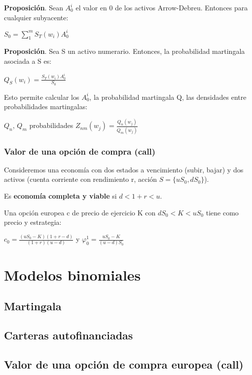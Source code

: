 \documentclass[
10pt, %
a4paper, %
oneside, %
headinclude,footinclude, %
BCOR5mm, %
]{scrartcl}
\newcommand{\n}[1]{\textbf{#1}}
\newcommand{\sub}[1]{_{#1}}
\newcommand{\pot}[1]{^{#1}}
\newcommand{\f}[1]{{\large{${#1}$}}}
\newcommand{\sumatorio}[2]{\sum_{#1}^{#2}}
\newcounter{ex}
\begin{document}
			\n{Proposición}. Sean \f{A\sub{0}\pot{i}} el valor en \f{0} de los activos Arrow-Debreu. Entonces para cualquier subyacente:
			\begin{center} \f{S\sub{0} = \sumatorio{1}{m} S\sub{T}(w\sub{i})A\sub{0}\pot{i}} \end{center}

			\n{Proposición}. Sea S un activo numerario. Entonces, la probabilidad martingala asociada a S es:
			\begin{center} \f{Q\sub{S}(w\sub{i}) = \frac{S\sub{T}(w\sub{i}) A\sub{0}\pot{i}}{S\sub{0}}} \end{center}

			Esto permite calcular los \f{A\sub{0}\pot{i}}, la probabilidad martingala Q, las densidades entre probabilidades martingalas: 
			\begin{center} \f{Q\sub{n}}, \f{Q\sub{m}} probabilidades \f{Z\sub{nm}(w\sub{j}) = \frac{Q\sub{n}(w\sub{j})}{Q\sub{m}(w\sub{j})}} \end{center}

		\subsubsection{Valor de una opción de compra (call)}

			Consideremos una economía con dos estados a vencimiento (subir, bajar) y dos activos (cuenta corriente con rendimiento r, acción \f{S = \{uS\sub{0},dS\sub{0}\}}). 

			Es \n{economía completa y viable} si \f{d < 1+r < u}.

			Una opción europea c de precio de ejercicio K con \f{dS\sub{0} < K < uS\sub{0}} tiene como precio y estrategia:
			\begin{center} \f{c\sub{0} = \frac{(uS\sub{0} - K)(1+r-d)}{(1+r)(u-d)}} y \f{\varphi\pot{1}\sub{0} = \frac{uS\sub{0}-K}{(u-d)S\sub{0}}} \end{center}

	\newpage

	\section{Modelos binomiales}

		\subsection{Martingala}

		\subsection{Carteras autofinanciadas}

		\subsection{Valor de una opción de compra europea (call)}


\printindex
\end{document}
